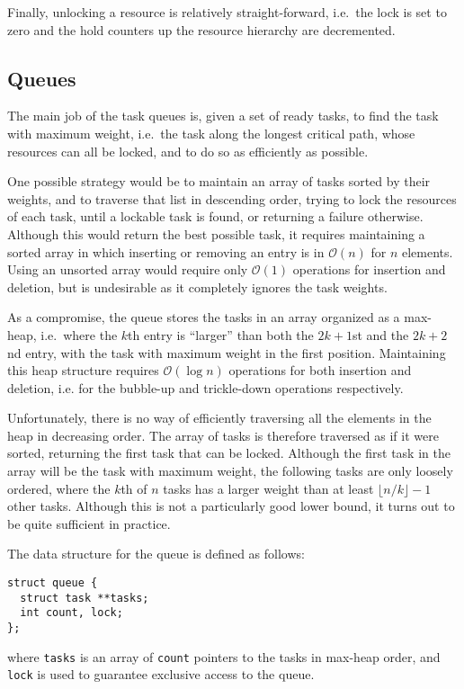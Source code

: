 \documentclass[preprint]{elsarticle}
\newcommand{\oh}[1]
    {\mbox{$ {\mathcal O}( #1 ) $}}
\begin{document}
Finally, unlocking a resource is relatively straight-forward,
i.e.~the lock is set to zero and the hold counters up the
resource hierarchy are decremented.


\subsection{Queues}

The main job of the task queues is, given a set of ready tasks,
to find the task with maximum weight, i.e.~the task along the
longest critical path, whose resources can all
be locked, and to do so as efficiently as possible.

One possible strategy would be to maintain an array of tasks
sorted by their weights, and to traverse that list in descending
order, trying to lock the resources of each task, until
a lockable task is found, or returning a failure otherwise.
Although this would return the best possible task, it
requires maintaining a sorted array in which inserting
or removing an entry is in \oh{n} for $n$ elements.
Using an unsorted array would require only \oh{1} operations for
insertion and deletion, but is undesirable as it completely
ignores the task weights.

As a compromise, the queue stores the tasks in an array
organized as a max-heap, i.e.~where the $k$th entry is ``larger''
than both the $2k+1$st and the $2k+2$nd entry,
with the task with maximum weight
in the first position.
Maintaining this heap structure requires \oh{\log n}
operations for both insertion and deletion, i.e. for the
bubble-up and trickle-down operations respectively.

Unfortunately, there is no way of efficiently traversing all
the elements in the heap in decreasing order.
The array of tasks is therefore traversed as if it were sorted,
returning the first task that can be locked.
Although the first task in the array will be the task with
maximum weight, the following tasks are only loosely ordered,
where the $k$th of $n$ tasks has a larger weight than at least
$\lfloor n/k\rfloor -1$ other tasks.
Although this is not a particularly good lower bound, it turns
out to be quite sufficient in practice.

The data structure for the queue is defined as follows:
\begin{center}\begin{minipage}{0.9\textwidth}
    \begin{lstlisting}
struct queue {
  struct task **tasks;
  int count, lock;
};
    \end{lstlisting}
\end{minipage}\end{center}
\noindent where {\tt tasks} is an array of {\tt count} pointers
to the tasks in max-heap order, and {\tt lock} is used to
guarantee exclusive access to the queue.
\end{document}
